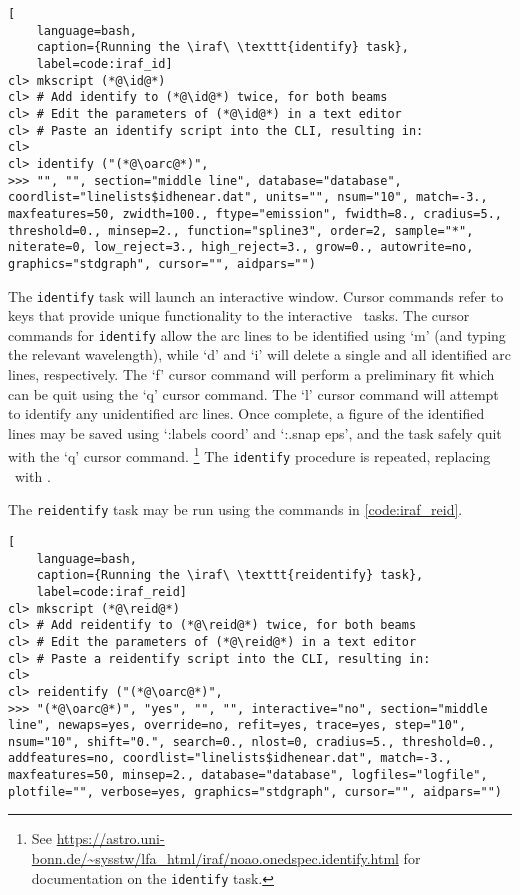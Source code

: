 \begin{lstlisting}[
    language=bash,
    caption={Running the \iraf\ \texttt{identify} task},
    label=code:iraf_id]
cl> mkscript (*@\id@*)
cl> # Add identify to (*@\id@*) twice, for both beams
cl> # Edit the parameters of (*@\id@*) in a text editor
cl> # Paste an identify script into the CLI, resulting in:
cl> 
cl> identify ("(*@\oarc@*)",
>>> "", "", section="middle line", database="database", coordlist="linelists$idhenear.dat", units="", nsum="10", match=-3., maxfeatures=50, zwidth=100., ftype="emission", fwidth=8., cradius=5., threshold=0., minsep=2., function="spline3", order=2, sample="*", niterate=0, low_reject=3., high_reject=3., grow=0., autowrite=no, graphics="stdgraph", cursor="", aidpars="")
\end{lstlisting}
{\parskip=0pt The} \texttt{identify} task will launch an interactive window. Cursor commands refer to keys that provide unique functionality to the interactive \iraf\ tasks. The cursor commands for \texttt{identify} allow the arc lines to be identified using `m' (and typing the relevant wavelength), while `d' and `i' will delete a single and all identified arc lines, respectively. The `f' cursor command will perform a preliminary fit which can be quit using the `q' cursor command. The `l' cursor command will attempt to identify any unidentified arc lines. Once complete, a figure of the identified lines may be saved using `:labels coord' and `:.snap eps', and the task safely quit with the `q' cursor command.%
\footnote{See \protect\url{https://astro.uni-bonn.de/~sysstw/lfa_html/iraf/noao.onedspec.identify.html} for documentation on the \texttt{identify} task.}
The \texttt{identify} procedure is repeated, replacing \oarc\ with \earc.

The \texttt{reidentify} task may be run using the commands in \autoref{code:iraf_reid}.

\begin{lstlisting}[
    language=bash,
    caption={Running the \iraf\ \texttt{reidentify} task},
    label=code:iraf_reid]
cl> mkscript (*@\reid@*)
cl> # Add reidentify to (*@\reid@*) twice, for both beams
cl> # Edit the parameters of (*@\reid@*) in a text editor
cl> # Paste a reidentify script into the CLI, resulting in:
cl> 
cl> reidentify ("(*@\oarc@*)",
>>> "(*@\oarc@*)", "yes", "", "", interactive="no", section="middle line", newaps=yes, override=no, refit=yes, trace=yes, step="10", nsum="10", shift="0.", search=0., nlost=0, cradius=5., threshold=0., addfeatures=no, coordlist="linelists$idhenear.dat", match=-3., maxfeatures=50, minsep=2., database="database", logfiles="logfile", plotfile="", verbose=yes, graphics="stdgraph", cursor="", aidpars="")
\end{lstlisting}

